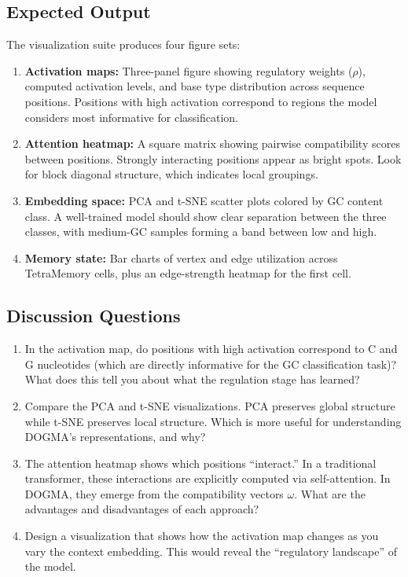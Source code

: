 \subsection{Expected Output}

The visualization suite produces four figure sets:

\begin{enumerate}[leftmargin=1.8em]
  \item \textbf{Activation maps:} Three-panel figure showing regulatory weights ($\rho$), computed activation levels, and base type distribution across sequence positions. Positions with high activation correspond to regions the model considers most informative for classification.
  \item \textbf{Attention heatmap:} A square matrix showing pairwise compatibility scores between positions. Strongly interacting positions appear as bright spots. Look for block diagonal structure, which indicates local groupings.
  \item \textbf{Embedding space:} PCA and t-SNE scatter plots colored by GC content class. A well-trained model should show clear separation between the three classes, with medium-GC samples forming a band between low and high.
  \item \textbf{Memory state:} Bar charts of vertex and edge utilization across TetraMemory cells, plus an edge-strength heatmap for the first cell.
\end{enumerate}

\subsection{Discussion Questions}

\begin{enumerate}[leftmargin=1.8em]
  \item In the activation map, do positions with high activation correspond to C and G nucleotides (which are directly informative for the GC classification task)? What does this tell you about what the regulation stage has learned?
  \item Compare the PCA and t-SNE visualizations. PCA preserves global structure while t-SNE preserves local structure. Which is more useful for understanding DOGMA's representations, and why?
  \item The attention heatmap shows which positions ``interact.'' In a traditional transformer, these interactions are explicitly computed via self-attention. In DOGMA, they emerge from the compatibility vectors $\omega$. What are the advantages and disadvantages of each approach?
  \item Design a visualization that shows how the activation map changes as you vary the context embedding. This would reveal the ``regulatory landscape'' of the model.
\end{enumerate}

